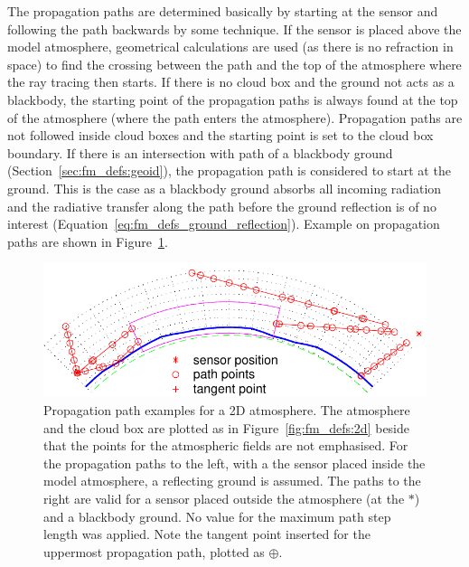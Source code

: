 The propagation paths are determined basically by starting at the
sensor and following the path backwards by some 
technique.  If the sensor is placed above the model atmosphere,
geometrical calculations are used (as there is no refraction in space)
to find the crossing between the path and the top of the atmosphere
where the ray tracing then starts. If there is no cloud box and the
ground not acts as a blackbody, the starting point of the propagation
paths is always found at the top of the atmosphere (where the path
enters the atmosphere). Propagation paths are not followed inside
cloud boxes and the starting point is set to the cloud box boundary.
If there is an intersection with path of a blackbody ground
(Section~\ref{sec:fm_defs:geoid}), the propagation path is considered
to start at the ground. This is the case as a blackbody ground absorbs
all incoming radiation and the radiative transfer along the path
before the ground reflection is of no interest
(Equation~\ref{eq:fm_defs_ground_reflection}). Example on propagation
paths are shown in Figure~\ref{fig:fm_defs:ppath_cases1}.

\begin{figure}[!t]
 \begin{center}
  \includegraphics*[width=0.95\hsize]{Figs/fm_definitions/ppath_cases1}
  \caption{Propagation path examples for a 2D atmosphere. The atmosphere 
    and the cloud box are plotted as in Figure~\ref{fig:fm_defs:2d}
    beside that the points for the atmospheric fields are not
    emphasised. For the propagation paths to the left, with a the
    sensor placed inside the model atmosphere, a reflecting ground is
    assumed. The paths to the right are valid for a sensor placed
    outside the atmosphere (at the $*$) and a blackbody ground. No
    value for the maximum path step length was applied. Note the tangent
    point inserted for the uppermost propagation path, plotted as $\oplus$.}
  \label{fig:fm_defs:ppath_cases1}
 \end{center}
\end{figure}
 
